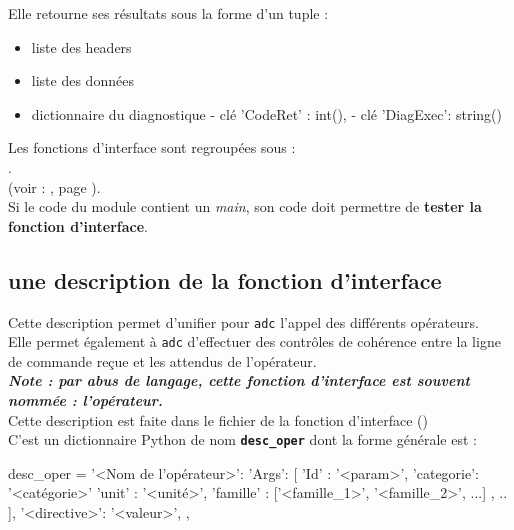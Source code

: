   Elle retourne ses résultats sous la forme d'un tuple :
  \begin{itemize}
    \item[•] liste des headers
    \item[•] liste des données
    \item[•] dictionnaire du diagnostique
    \subitem - clé 'CodeRet' : int(),
    \subitem - clé 'DiagExec': string()
  \end{itemize}
\medbreak

  Les fonctions d'interface sont regroupées sous : \\
  \-\hspace{1cm} . \\

  (voir : , page \pageref{sec:ex_fct_interface}). \\

  Si le code du module contient un \textit{main}, son code doit permettre de
  \textbf{tester la fonction d'interface}.


\subsection{une description de la fonction d'interface}
  Cette description permet d'unifier pour \texttt{adc} l'appel des
  différents opérateurs. \\
  Elle permet également à \texttt{adc} d'effectuer des contrôles de cohérence
  entre la ligne de commande reçue et les attendus de l'opérateur. \\
  \textbf{\textit{Note : par abus de langage, cette fonction d'interface est
                  souvent nommée : \textit{l'opérateur}. }} \\

  Cette description est faite dans le fichier de la fonction d'interface
  () \\
  C'est un dictionnaire Python de nom \textbf{\texttt{desc\_oper}} dont la
  forme générale est :
  \medbreak

  \begin{boxedverbatim}
    desc_oper = {
        '<Nom de l'opérateur>': {
            'Args': [
                {'Id'       : '<param>',
                 'categorie': '<catégorie>'
                 'unit'     : '<unité>',
                 'famille'  : ['<famille_1>', '<famille_2>', ...]
                },
                ..
            ],
        '<directive>': '<valeur>',
        },
    }
  \end{boxedverbatim}
  \medbreak


